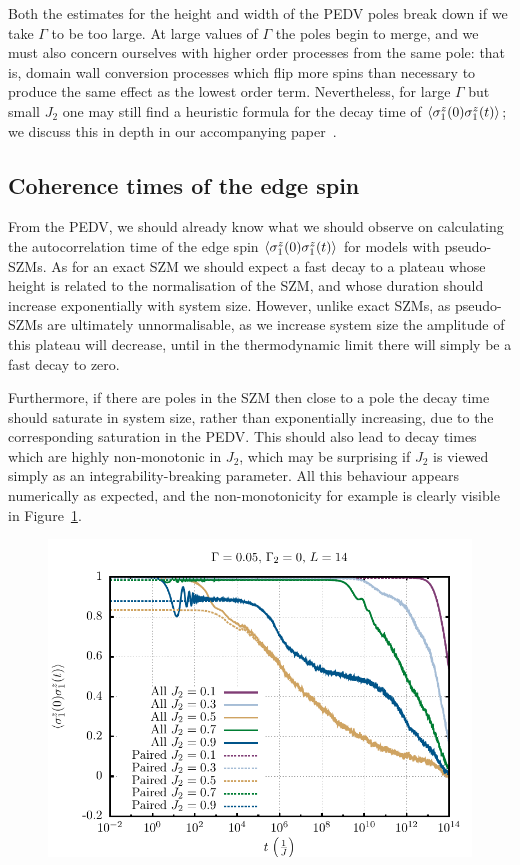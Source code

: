 \documentclass [a4paper, 11pt]{article}
\begin{document}
Both the estimates for the height and width of the PEDV poles break down if we take $\Gamma$ to be too large. At large values of $\Gamma$ the poles begin to merge, and we must also concern ourselves with higher order processes from the same pole: that is, domain wall conversion processes which flip more spins than necessary to produce the same effect as the lowest order term. Nevertheless, for large $\Gamma$ but small $J_2$ one may still find a heuristic formula for the decay time of $\Braket{\sigma^z_1(0)\sigma^z_1(t)}$; we discuss this in depth in our accompanying paper~\cite{flashypaper}.

\subsection{Coherence times of the edge spin}
From the PEDV, we should already know what we should observe on calculating the autocorrelation time of the edge spin $\Braket{\sigma^z_1(0)\sigma^z_1(t)}$ for models with pseudo-SZMs. As for an exact SZM we should expect a fast decay to a plateau whose height is related to the normalisation of the SZM, and whose duration should increase exponentially with system size. However, unlike exact SZMs, as pseudo-SZMs are ultimately unnormalisable, as we increase system size the amplitude of this plateau will decrease, until in the thermodynamic limit there will simply be a fast decay to zero.

Furthermore, if there are poles in the SZM then close to a pole the decay time should saturate in system size, rather than exponentially increasing, due to the corresponding saturation in the PEDV. This should also lead to decay times which are highly non-monotonic in $J_2$, which may be surprising if $J_2$ is viewed simply as an integrability-breaking parameter. All this behaviour appears numerically as expected, and the non-monotonicity for example is clearly visible in Figure~\ref{fig:j2decay}.

\begin{figure} [htbp]
\centering
 \includegraphics[width=\linewidth]{J2_decay.pdf}
\caption{}
\label{fig:j2decay}
\end{figure}
\end{document}
